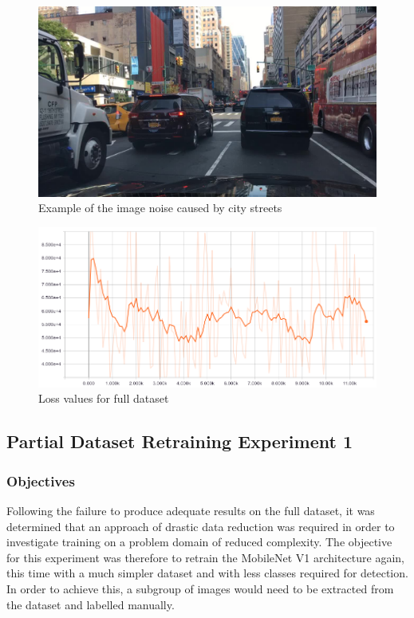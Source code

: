 \documentclass[12pt]{report}
\begin{document}
\vspace{0.5cm}
\begin{figure}[ht!]
	\centering
	\includegraphics[width=12cm]{street}
	\caption{Example of the image noise caused by city streets}
	\label{fig:street}
\end{figure}

\vspace{0.5cm}
\begin{figure}[ht!]
	\centering
	\includegraphics[width=12cm]{mobilenet-full-dataset-loss}
	\caption{Loss values for full dataset}
	\label{fig:mobilenet-full-dataset-loss}
\end{figure}

\subsection{Partial Dataset Retraining Experiment 1}
\subsubsection{Objectives}
\begin{flushleft}
Following the failure to produce adequate results on the full dataset, it was determined that an approach of drastic data reduction was required in order to investigate training on a problem domain of reduced complexity. The objective for this experiment was therefore to retrain the MobileNet V1 architecture again, this time with a much simpler dataset and with less classes required for detection. In order to achieve this, a subgroup of images would need to be extracted from the dataset and labelled manually.
\end{flushleft}
\end{document}
